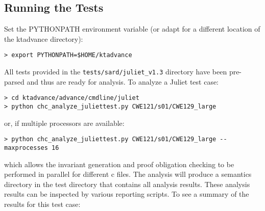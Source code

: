 \documentclass[11pt]{article}
\begin{document}
\subsection{Running the Tests}

Set the PYTHONPATH environment variable (or adapt for a different location of the ktadvance
directory):
\begin{verbatim}
> export PYTHONPATH=$HOME/ktadvance
\end{verbatim}
All tests provided in the {\tt tests/sard/juliet\_v1.3} directory have been pre-parsed and
thus are ready for analysis. To analyze a Juliet test case:
\begin{verbatim}
> cd ktadvance/advance/cmdline/juliet
> python chc_analyze_juliettest.py CWE121/s01/CWE129_large
\end{verbatim}
or, if multiple processors are available:
\begin{verbatim}
> python chc_analyze_juliettest.py CWE121/s01/CWE129_large --maxprocesses 16
\end{verbatim}
which allows the invariant generation and proof obligation checking to be
performed in parallel for different c files.
The analysis will produce a semantics directory in the test directory that contains all analysis
results. These analysis results can be inspected by various reporting scripts.
To see a summary of the results for this test case:
\end{document}
